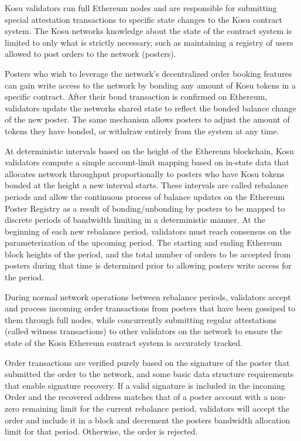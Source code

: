 \documentclass[9pt]{article}
\begin{document}
\medskip

\noindent Kosu validators run full Ethereum nodes and are responsible for submitting special attestation transactions to specific state changes to the Kosu contract system. The Kosu networks knowledge about the state of the contract system is limited to only what is strictly necessary, such as maintaining a registry of users allowed to post orders to the network (posters).

\medskip

\noindent Posters who wish to leverage the network’s decentralized order booking features can gain write access to the network by bonding any amount of Kosu tokens in a specific contract. After their bond transaction is confirmed on Ethereum, validators update the networks shared state to reflect the bonded balance change of the new poster. The same mechanism allows posters to adjust the amount of tokens they have bonded, or withdraw entirely from the system at any time.

\medskip

\noindent At deterministic intervals based on the height of the Ethereum blockchain, Kosu validators compute a simple account-limit mapping based on in-state data that allocates network throughput proportionally to posters who have Kosu tokens bonded at the height a new interval starts. These intervals are called rebalance periods and allow the continuous process of balance updates on the Ethereum Poster Registry as a result of bonding/unbonding by posters to be mapped to discrete periods of bandwidth limiting in a deterministic manner. At the beginning of each new rebalance period, validators must reach consensus on the parameterization of the upcoming period. The starting and ending Ethereum block heights of the period, and the total number of orders to be accepted from posters during that time is determined prior to allowing posters write access for the period.

\medskip

\noindent During normal network operations between rebalance periods, validators accept and process incoming order transactions from posters that have been gossiped to them through full nodes, while concurrently submitting regular attestations (called witness transactions) to other validators on the network to ensure the state of the Kosu Ethereum contract system is accurately tracked.

\medskip

\noindent Order transactions are verified purely based on the signature of the poster that submitted the order to the network, and some basic data structure 
requirements that enable signature recovery. If a valid signature is included in the incoming Order and the recovered address matches that of a poster account with a non-zero remaining limit for the current rebalance period, validators will accept the order and include it in a block and decrement the posters bandwidth allocation limit for that period. Otherwise, the order is rejected.
\end{document}
